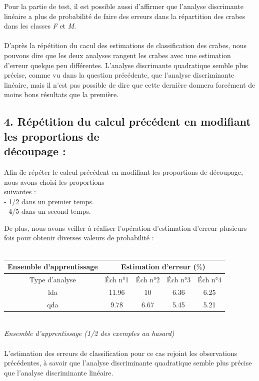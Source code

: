 \documentclass[a4paper, 10pt]{article}
\begin{document}
Pour la partie de test, il est possible aussi d'affirmer que l'analyse discrimante linéaire a plus de probabilité de faire des erreurs
dans la répartition des crabes dans les classes \textit{F} et \textit{M}.\\ \\
D'après la répétition du cacul des estimations de classification des crabes, nous pouvons dire que les deux analyses rangent les crabes
avec une estimation d'erreur quelque peu différentes.
L'analyse discrimante quadratique semble plus précise, comme vu dans la question précédente, que l'analyse discriminante linéaire,
mais il n'est pas possible de dire que cette dernière donnera forcément de moins bons résultats que la première.

\newpage
\subsection*{4. Répétition du calcul précédent en modifiant les proportions de\\découpage :}
\begin{tabbing}
Afin \= de répéter le calcul précédent en modifiant les proportions de découpage, nous avons choisi les proportions\\suivantes :\\
\> - 1/2 dans un premier temps.\\
\> - 4/5 dans un second temps.
\end{tabbing}
De plus, nous avons veiller à réaliser l'opération d'estimation d'erreur plusieurs fois pour obtenir diverses valeurs de probabilité :\\ \\
\begin{tabular}{|c|c|c|c|c|}
\hline
\textbf{Ensemble d'apprentissage} & \multicolumn{4}{|c|}{Estimation d'erreur ($\%$)} \\
\hline
Type d'analyse & Éch n°1 & Éch n°2 & Éch n°3 & Éch n°4 \\
\hline
lda & 11.96 & 10 & 6.36 & 6.25 \\
\hline
qda & 9.78 & 6.67 & 5.45 & 5.21 \\
\hline
\end{tabular}\\
\textit{Ensemble d'apprentissage (1/2 des exemples au hasard)}\\ \\
L'estimation des erreurs de classification pour ce cas rejoint les observations précédentes,
à savoir que l'analyse discriminante quadratique semble plus précise que l'analyse discriminante linéaire.\\ \\
\end{document}
